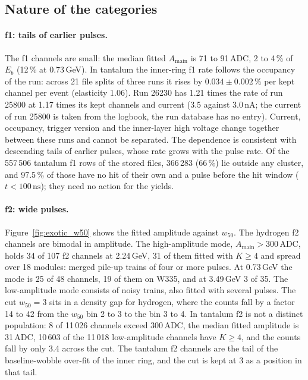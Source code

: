 \documentclass[11pt]{article}
\newcommand{\ns}{\,\mathrm{ns}}
\newcommand{\adc}{\,\mathrm{ADC}}
\begin{document}
\subsection{Nature of the categories}
\label{sec:exotic_nature}

\paragraph{f1: tails of earlier pulses.} The f1 channels are small: the median fitted $A_{\mathrm{main}}$ is 71 to 91\,ADC, 2 to 4\,\% of $E_b$ (12\,\% at 0.73\,GeV). In tantalum the inner-ring f1 rate follows the occupancy of the run: across 21 file splits of three runs it rises by $0.034 \pm 0.002\,\%$ per kept channel per event (elasticity 1.06). Run 26230 has 1.21 times the rate of run 25800 at 1.17 times its kept channels and current (3.5 against 3.0\,nA; the current of run 25800 is taken from the logbook, the run database has no entry). Current, occupancy, trigger version and the inner-layer high voltage change together between these runs and cannot be separated. The dependence is consistent with descending tails of earlier pulses, whose rate grows with the pulse rate. Of the 557\,506 tantalum f1 rows of the stored files, 366\,283 (66\,\%) lie outside any cluster, and 97.5\,\% of those have no hit of their own and a pulse before the hit window ($t < 100\ns$); they need no action for the yields.

\paragraph{f2: wide pulses.} Figure~\ref{fig:exotic_w50} shows the fitted amplitude against $w_{50}$. The hydrogen f2 channels are bimodal in amplitude. The high-amplitude mode, $A_{\mathrm{main}} > 300\adc$, holds 34 of 107 f2 channels at 2.24\,GeV, 31 of them fitted with $K \ge 4$ and spread over 18 modules: merged pile-up trains of four or more pulses. At 0.73\,GeV the mode is 25 of 48 channels, 19 of them on W335, and at 3.49\,GeV 3 of 35. The low-amplitude mode consists of noisy trains, also fitted with several pulses. The cut $w_{50} = 3$ sits in a density gap for hydrogen, where the counts fall by a factor 14 to 42 from the $w_{50}$ bin 2 to 3 to the bin 3 to 4. In tantalum f2 is not a distinct population: 8 of 11\,026 channels exceed 300\,ADC, the median fitted amplitude is 31\,ADC, 10\,603 of the 11\,018 low-amplitude channels have $K \ge 4$, and the counts fall by only 3.4 across the cut. The tantalum f2 channels are the tail of the baseline-wobble over-fit of the inner ring, and the cut is kept at 3 as a position in that tail.
\end{document}
